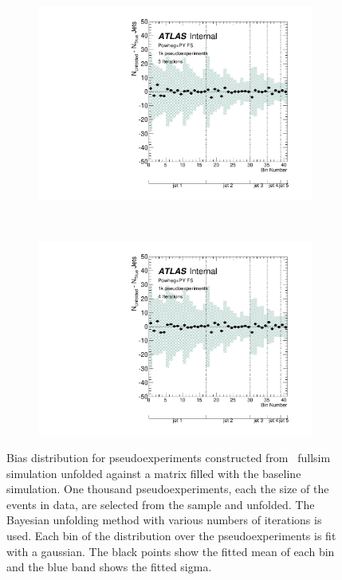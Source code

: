 \begin{figure}
\begin{subfigure}[]{0.5\textwidth}
\includegraphics[width=\textwidth]{fig/Stress/117050fullsim/Bias3Iterations.pdf}
\end{subfigure}
~
\begin{subfigure}[]{0.5\textwidth}
\includegraphics[width=\textwidth]{fig/Stress/117050fullsim/Bias4Iterations.pdf}
\end{subfigure}
\caption{Bias distribution for pseudoexperiments constructed from \newline \powpy\ fullsim simulation unfolded against a matrix filled with the baseline simulation. One thousand pseudoexperiments, each the size of the events in data, are selected from the sample and unfolded. The Bayesian unfolding method with various numbers of iterations is used. Each bin of the distribution over the pseudoexperiments is fit with a gaussian. The black points show the fitted mean of each bin and the blue band shows the fitted sigma.}
\label{fig:fsbias}
\end{figure}
